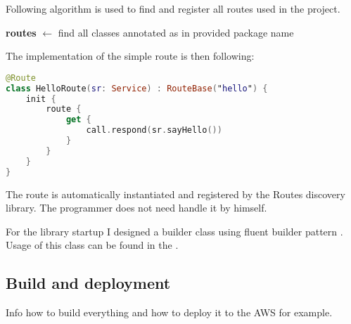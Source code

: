 \medskip \noindent
Following algorithm is used to find and register all routes used in the project.

\begin{algorithm}[H]
	\SetAlgoLined
	\textbf{routes} $\leftarrow$ find all classes annotated as  in provided package name\;
\end{algorithm} 
\medskip \noindent
The implementation of the simple route is then following:
\medskip
\begin{lstlisting}[language=Kotlin]
@Route
class HelloRoute(sr: Service) : RouteBase("hello") {
    init {
        route {
            get {
                call.respond(sr.sayHello())
            }
        }
    }
}
\end{lstlisting}

\medskip \noindent
The route is automatically instantiated and registered by the Routes discovery library.
The programmer does not need handle it by himself.

For the library startup I designed a builder class using fluent builder pattern .
Usage of this class can be found in the .

\subsection{Build and deployment}\label{subsec:build-and-deployment}
Info how to build everything and how to deploy it to the AWS for example.
